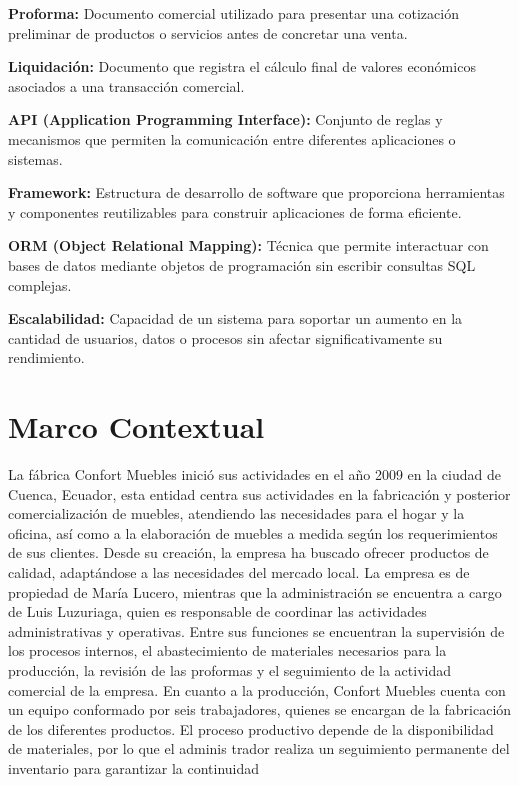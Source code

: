 \textbf{Proforma:} Documento comercial utilizado para presentar una cotización preliminar de productos o servicios antes de concretar una venta.

\textbf{Liquidación:} Documento que registra el cálculo final de valores económicos asociados a una transacción comercial.

\textbf{API (Application Programming Interface):} Conjunto de reglas y mecanismos que permiten la comunicación entre diferentes aplicaciones o sistemas.

\textbf{Framework:} Estructura de desarrollo de software que proporciona herramientas y componentes reutilizables para construir aplicaciones de forma eficiente.

\textbf{ORM (Object Relational Mapping):} Técnica que permite interactuar con bases de datos mediante objetos de programación sin escribir consultas SQL complejas.

\textbf{Escalabilidad:} Capacidad de un sistema para soportar un aumento en la cantidad de usuarios, datos o procesos sin afectar significativamente su rendimiento.

\section{Marco Contextual}
La fábrica Confort Muebles inició sus actividades en el año 2009 en la ciudad de
Cuenca, Ecuador, esta entidad centra sus actividades en la fabricación y posterior comercialización de muebles, atendiendo las necesidades para el hogar y la oficina, así como a la elaboración de muebles a medida según los requerimientos
de sus clientes. Desde su creación, la empresa ha buscado ofrecer productos de calidad,
adaptándose a las necesidades del mercado local.
La empresa es de propiedad de María Lucero, mientras que la administración se
encuentra a cargo de Luis Luzuriaga, quien es responsable de coordinar las actividades
administrativas y operativas. Entre sus funciones se encuentran la supervisión de los
procesos internos, el abastecimiento de materiales necesarios para la producción, la
revisión de las proformas y el seguimiento de la actividad comercial de la empresa.
En cuanto a la producción, Confort Muebles cuenta con un equipo conformado
por seis trabajadores, quienes se encargan de la fabricación de los diferentes productos.
El proceso productivo depende de la disponibilidad de materiales, por lo que el adminis
trador realiza un seguimiento permanente del inventario para garantizar la continuidad


